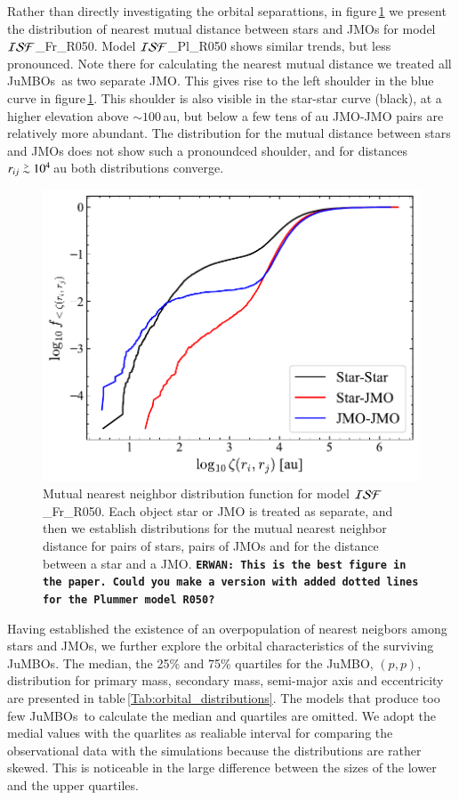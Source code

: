 \documentclass[submission,phys]{lib/SciPost}
\newcommand{\erwan}[1] {{\texttt{\textbf{ERWAN: #1}}} }
\def\apgt{\ {\raise-.5ex\hbox{$\buildrel>\over\sim$}}\ }
\newcommand{\jumbo}{\mbox{JuMBO}}
\newcommand{\jumbos}{\mbox{JuMBOs}}
\begin{document}
Rather than directly investigating the orbital separattions, in
figure\,\ref{Fig:twopoint_correlation_ISF_Fr050} we present the
distribution of nearest mutual distance between stars and JMOs for
model ${\cal ISF}$\_Fr\_R050.  Model ${\cal ISF}$\_Pl\_R050 shows
similar trends, but less pronounced.  Note there for calculating the
nearest mutual distance we treated all \jumbos\, as two separate JMO.
This gives rise to the left shoulder in the blue curve in
figure\,\ref{Fig:twopoint_correlation_ISF_Fr050}. This shoulder is
also visible in the star-star curve (black), at a higher elevation
above $\sim 100$\,au, but below a few tens of au JMO-JMO pairs are
relatively more abundant.  The distribution for the mutual distance
between stars and JMOs does not show such a pronoundced shoulder, and
for distances $r_{ij} \apgt 10^4$\,au both distributions converge.

\begin{figure}
    \centering
        \includegraphics[width=0.75\columnwidth]{figures/two_point_corrFractal_rvir0.5_jmo.pdf}
        \caption{Mutual nearest neighbor distribution function for
          model ${\cal ISF}$\_Fr\_R050. Each object star or JMO is
          treated as separate, and then we establish distributions for
          the mutual nearest neighbor distance for pairs of stars,
          pairs of JMOs and for the distance between a star and a JMO.
          \erwan{ This is the best figure in the paper. Could you make
            a version with added dotted lines for the Plummer model
            R050?}}
        \label{Fig:twopoint_correlation_ISF_Fr050}
\end{figure}

Having established the existence of an overpopulation of nearest
neigbors among stars and JMOs, we further explore the orbital
characteristics of the surviving \jumbos.  The median, the 25\% and
75\% quartiles for the \jumbo, $(p,p)$, distribution for primary mass,
secondary mass, semi-major axis and eccentricity are presented in
table\,\ref{Tab:orbital_distributions}.  The models that produce too
few \jumbos\, to calculate the median and quartiles are omitted.  We
adopt the medial values with the quarlites as realiable interval for
comparing the observational data with the simulations because the
distributions are rather skewed. This is noticeable in the large
difference between the sizes of the lower and the upper quartiles.
\end{document}
